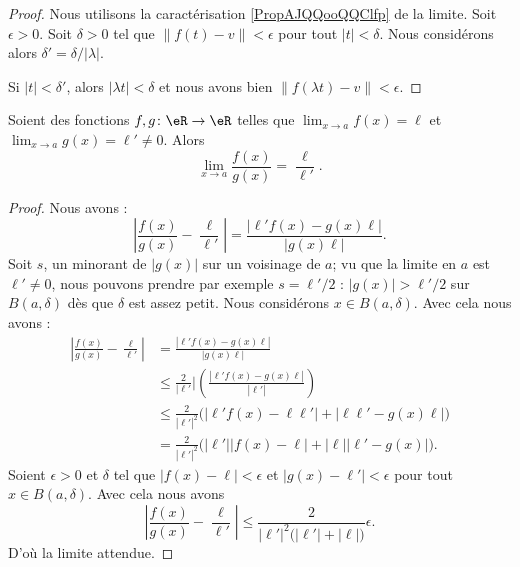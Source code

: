 \begin{proof}
	Nous utilisons la caractérisation \eqref{PropAJQQooQQClfp} de la limite. Soit \( \epsilon>0\). Soit \( \delta>0\) tel que \( \| f(t)-v \|<\epsilon\) pour tout \( | t |<\delta\). Nous considérons alors \( \delta'=\delta/| \lambda |\).

	Si \( | t |<\delta'\), alors \( | \lambda t |<\delta\) et nous avons bien \( \| f(\lambda t)-v \|<\epsilon\).
\end{proof}

\begin{proposition}      \label{PROPooOUPNooTrClHw}
	Soient des fonctions \( f,g\colon \eR\to \eR\) telles que \( \lim_{x\to a} f(x)=\ell\) et \( \lim_{x\to a} g(x)=\ell'\neq 0\). Alors
	\begin{equation}
		\lim_{x\to a} \frac{ f(x) }{ g(x) }=\frac{ \ell }{ \ell' }.
	\end{equation}
\end{proposition}

\begin{proof}
	Nous avons :
	\begin{equation}
		\left| \frac{ f(x) }{ g(x) }-\frac{ \ell }{ \ell' } \right| =\frac{ | \ell'f(x)-g(x)\ell | }{ |g(x)\ell| }.
	\end{equation}
	Soit \( s\), un minorant de \( | g(x) |\) sur un voisinage de \( a\); vu que la limite en \( a\) est \( \ell'\neq 0\), nous pouvons prendre par exemple \( s=\ell'/2\) : \( | g(x) |>\ell'/2\) sur \( B(a,\delta)\) dès que \( \delta\) est assez petit. Nous considérons \( x\in B(a,\delta)\). Avec cela nous avons :
	\begin{subequations}
		\begin{align}
			\left| \frac{ f(x) }{ g(x) }-\frac{ \ell }{ \ell' } \right| & =\frac{ | \ell'f(x)-g(x)\ell | }{ |g(x)\ell| }                                           \\
			                                                            & \leq \frac{ 2 }{ | \ell'} |\left( \frac{ | \ell'f(x)-g(x)\ell | }{ | \ell' | } \right)   \\
			                                                            & \leq \frac{ 2 }{ | \ell' |^2 }\big( | \ell'f(x)-\ell\ell' |+| \ell\ell'-g(x)\ell | \big) \\
			                                                            & =\frac{ 2 }{ | \ell' |^2 }\big( | \ell' | |f(x)-\ell |+| \ell | |\ell'-g(x) | \big).
		\end{align}
	\end{subequations}
	Soient \( \epsilon>0\) et \( \delta\) tel que \( | f(x)-\ell |<\epsilon\) et \( | g(x)-\ell' |<\epsilon\) pour tout \( x\in B(a,\delta)\). Avec cela nous avons
	\begin{equation}
		\left| \frac{ f(x) }{ g(x) }-\frac{ \ell }{ \ell' } \right| \leq\frac{ 2 }{ | \ell' |^2\big( | \ell' |+| \ell | \big) }\epsilon.
	\end{equation}
	D'où la limite attendue.
\end{proof}

